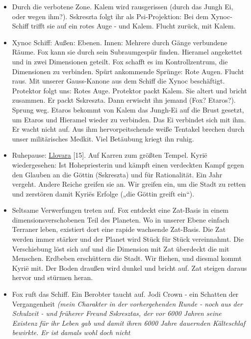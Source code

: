 \documentclass[11pt]{article}
\begin{document}
\begin{itemize}
\item
  Durch die verbotene Zone. Kalem wird rausgerissen (durch das Jungh Ei,
  oder wegen ihm?). Sskreszta folgt ihr als Psi-Projektion: Bei dem
  Xynoc-Schiff trifft sie auf ein rotes Auge - und Kalem. Flucht zurück,
  mit Kalem.
\item
  Xynoc Schiff: Außen: Ebenen. Innen: Mehrere durch Gänge verbundene
  Räume. Fox kann sie durch sein Subraumgespür finden. Hieramel
  angekettet und in zwei Dimensionen geteilt. Fox schafft es im
  Kontrollzentrum, die Dimensionen zu verbinden. Spürt ankommende
  Sprünge: Rote Augen. Flucht raus. Mit unserer Gauss-Kanone aus dem
  Schiff die Xynoc beschäftigt. Protektor folgt uns: Rotes Auge.
  Protektor packt Kalem. Sie altert und bricht zusammen. Er packt
  Sskreszta. Dann erwischt ihn jemand (Fox? Etaros?). Sprung weg. Etaros
  bekommt von Kalem das Jungh-Ei auf die Brust gesetzt, um Etaros und
  Hieramel wieder zu verbinden. Das Ei verbindet sich mit ihm. Er wacht
  nicht auf. Aus ihm hervorpeitschende weiße Tentakel brechen durch
  unser militärisches Medkit. Viel Betäubung kriegt ihn ruhig.
\item
  Ruhepause:
  \href{http://1w6.org/deutsch/kampagnen/w-chter-der-zeit/orte/llovara}{Llovara}
  {[}15{]}. Auf Karren zum größten Tempel. Kyrië wiedergesehen: Ist
  Hohepriesterin und kämpft einen verdeckten Kampf gegen den Glauben an
  die Göttin (Sskreszta) und für Rationalität. Ein Jahr vergeht. Andere
  Reiche greifen sie an. Wir greifen ein, um die Stadt zu retten und
  zerstören damit Kyriës Erfolge („die Göttin greift ein``).
\item
  Seltsame Verwerfungen treten auf. Fox entdeckt eine Zat-Basis in einem
  dimensionsverschobenen Teil des Planeten. Wo in unserer Ebene einfach
  Terraner leben, existiert dort eine rapide wachsende Zat-Basis. Die
  Zat werden immer stärker und der Planet wird Stück für Stück
  vereinnahmt. Die Verschiebung löst sich auf und die Dimension mit Zat
  überdeckt die mit Menschen. Erdbeben erschüttern die Stadt. Wir
  fliehen, und diesmal kommt Kyrië mit. Der Boden draußen wird dunkel
  und bricht auf. Zat steigen daraus hervor und stürmen heran.
\item
  Fox ruft das Schiff. Ein Berobter taucht auf. Jodi Crown - ein
  Schatten der Vergangenheit \emph{(mein Charakter in der vorhergehenden
  Runde - noch aus der Schulzeit - und früherer Freund Sskresztas, der
  vor 6000 Jahren seine Existenz für ihr Leben gab und damit ihren 6000
  Jahre dauernden Kälteschlaf bewirkte. Er ist damals wohl doch nicht
}
\end{itemize}
\end{document}
